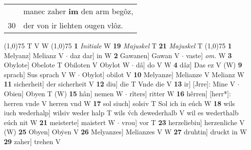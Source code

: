 \documentclass[8pt,a4paper,notitlepage]{article}
\begin{document}
\begin{table}[ht]
\begin{minipage}[t]{0.5\linewidth}
\begin{tabular}{rl}
 & manec zaher \textbf{im} den arm begôz,\\ 
30 & der von ir liehten ougen vlôz.\\ 
\end{tabular}
\scriptsize
\line(1,0){75} \newline
T V W \newline
\line(1,0){75} \newline
\textbf{1} \textit{Initiale} W  \textbf{19} \textit{Majuskel} T  \textbf{21} \textit{Majuskel} T  \newline
\line(1,0){75} \newline
\textbf{1} Melyanz] Melianz V  $\cdot$ daz dar] in W \textbf{2} Gawanen] Gawan V  $\cdot$ vaste] \textit{om.} W \textbf{3} Obylote] Obelote T Obiloten V Obylot W  $\cdot$ dâ] do V W \textbf{4} dâz] Das ez V (W) \textbf{9} sprach] Sus sprach V W  $\cdot$ Obylot] obilot V \textbf{10} Melyanze] Melianze V Melianz W \textbf{11} sicherheit] der sicherheit V \textbf{12} diu] die T Vnde die V \textbf{13} ir] [Jrre]: Mine V  $\cdot$ Obien] Obyen T (W) \textbf{15} hân] nemen W  $\cdot$ rîters] ritter W \textbf{16} hêrren] [herr*]: herren vnde V herren vnd W \textbf{17} sol siuch] solsiv T Sol ich in eúch W \textbf{18} wils iuch wederhalp] wilsiv weder halp T wils v́ch dewederhalb V wil es wederthalb eúch nit W \textbf{21} meisterte] maistert W  $\cdot$ vrou] vor T \textbf{23} herzeliebiu] herzenliche V (W) \textbf{25} Obyen] Obẏen V \textbf{26} Melyanzes] Melianzes V W \textbf{27} druhtin] druckt in W \textbf{29} zaher] trehen V \newline
\end{minipage}
\end{table}
\end{document}
